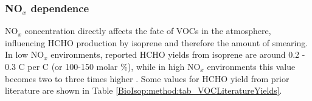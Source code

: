 {      
      
    
      
      
    \subsubsection{NO$_x$ dependence}
    
      NO$_x$ concentration directly affects the fate of VOCs in the atmosphere, influencing HCHO production by isoprene and therefore the amount of smearing.
      In low NO$_x$ environments, reported HCHO yields from isoprene are around 0.2 - 0.3 C per C (or 100-150 molar \%), while in high NO$_x$ environments this value becomes two to three times higher \parencite{Palmer2003, Wolfe2016}.
      Some values for HCHO yield from prior literature are shown in Table \ref{BioIsop:method:tab_VOCLiteratureYields}.
      
      
}
